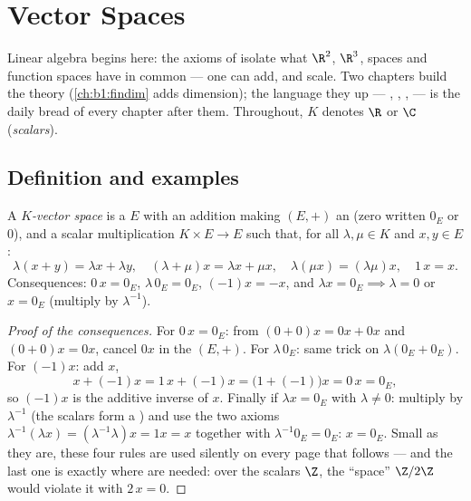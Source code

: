 \chapter{Vector Spaces}\label{ch:b1:vspaces}

Linear algebra begins here: the axioms of  isolate what
$\R^2$, $\R^3$,  spaces and function spaces have in common
--- one can add, and scale. Two chapters build the theory
(\cref{ch:b1:findim} adds dimension); the language they  up ---
, , ,  --- is the daily bread of every
chapter after them. Throughout, $K$ denotes $\R$ or $\C$
(\emph{scalars}).

\section{Definition and examples}

\begin{definition}\label{def:b1:vspaces:def}
A \emph{$K$-vector space} is a  $E$ with an
addition making $(E, +)$ an  (zero written $0_E$ or
$0$), and a scalar multiplication $K \times E \to E$ such that, for
all $\lambda, \mu \in K$ and $x, y \in E$:
\[
\lambda(x + y) = \lambda x + \lambda y,\quad
(\lambda + \mu) x = \lambda x + \mu x,\quad
\lambda(\mu x) = (\lambda\mu) x,\quad
1\,x = x .
\]
Consequences: $0\,x = 0_E$, $\lambda\,0_E = 0_E$, $(-1)x = -x$, and
$\lambda x = 0_E \implies \lambda = 0$ or $x = 0_E$ (multiply by
$\lambda^{-1}$).
\end{definition}

\begin{proof}[Proof of the consequences]
For $0\,x = 0_E$: from $(0 + 0)x = 0x + 0x$ and $(0+0)x = 0x$,
cancel $0x$ in the  $(E, +)$. For $\lambda\,0_E$: same
trick on $\lambda(0_E + 0_E)$. For $(-1)x$: add $x$,
\[
x + (-1)x = 1\,x + (-1)x = \bigl(1 + (-1)\bigr)x = 0\,x = 0_E ,
\]
so $(-1)x$ is the additive inverse of $x$. Finally if $\lambda x
= 0_E$ with $\lambda \neq 0$: multiply by $\lambda^{-1}$ (the
scalars form a ) and use the two axioms
$\lambda^{-1}(\lambda x) = (\lambda^{-1}\lambda)x = 1x = x$
together with $\lambda^{-1}0_E = 0_E$: $x = 0_E$. Small as they
are, these four rules are used silently on every page that
follows --- and the last one is exactly where  are needed:
over the scalars $\Z$, the ``space'' $\Z/2\Z$ would violate it
with $2\,x = 0$.
\end{proof}

